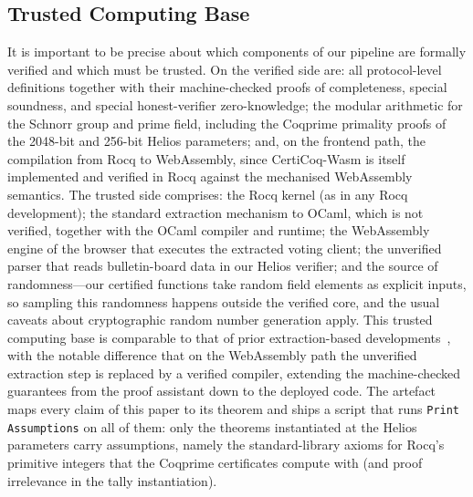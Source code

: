 \documentclass[sigconf,anonymous,review]{acmart}
\begin{document}
\subsection{Trusted Computing Base}\label{tcb}
It is important to be precise about which components of our pipeline are formally verified and which must be trusted. On the verified side are: all protocol-level definitions together with their machine-checked proofs of completeness, special soundness, and special honest-verifier zero-knowledge; the modular arithmetic for the Schnorr group and prime field, including the Coqprime primality proofs of the 2048-bit and 256-bit Helios parameters; and, on the frontend path, the compilation from Rocq to WebAssembly, since CertiCoq-Wasm is itself implemented and verified in Rocq against the mechanised WebAssembly semantics. The trusted side comprises: the Rocq kernel (as in any Rocq development); the standard extraction mechanism to OCaml, which is not verified, together with the OCaml compiler and runtime; the WebAssembly engine of the browser that executes the extracted voting client; the unverified parser that reads bulletin-board data in our Helios verifier; and the source of randomness---our certified functions take random field elements as explicit inputs, so sampling this randomness happens outside the verified core, and the usual caveats about cryptographic random number generation apply. This trusted computing base is comparable to that of prior extraction-based developments~\cite{287095}, with the notable difference that on the WebAssembly path the unverified extraction step is replaced by a verified compiler, extending the machine-checked guarantees from the proof assistant down to the deployed code. The artefact maps every claim of this paper to its theorem and ships a script that runs \texttt{Print Assumptions} on all of them: only the theorems instantiated at the Helios parameters carry assumptions, namely the standard-library axioms for Rocq's primitive integers that the Coqprime certificates compute with (and proof irrelevance in the tally instantiation).
\end{document}
